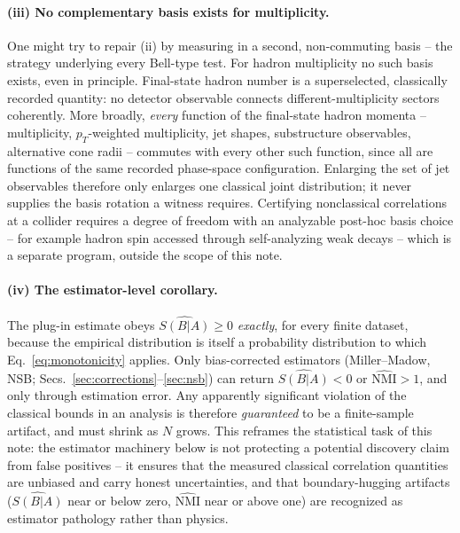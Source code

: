 \documentclass[11pt]{article}
\newcommand{\SBA}{S(B|A)}
\newcommand{\NMI}{\mathrm{NMI}}
\begin{document}
\paragraph{(iii) No complementary basis exists for multiplicity.} One
might try to repair (ii) by measuring in a second, non-commuting basis --
the strategy underlying every Bell-type test. For hadron multiplicity no
such basis exists, even in principle. Final-state hadron number is a
superselected, classically recorded quantity: no detector observable
connects different-multiplicity sectors coherently. More broadly,
\emph{every} function of the final-state hadron momenta -- multiplicity,
$p_T$-weighted multiplicity, jet shapes, substructure observables,
alternative cone radii -- commutes with every other such function, since
all are functions of the same recorded phase-space configuration.
Enlarging the set of jet observables therefore only enlarges one
classical joint distribution; it never supplies the basis rotation a
witness requires. Certifying nonclassical correlations at a collider
requires a degree of freedom with an analyzable post-hoc basis choice --
for example hadron spin accessed through self-analyzing weak decays
\cite{GPTV2022,AfikDeNova2023} -- which is a separate program, outside
the scope of this note.

\paragraph{(iv) The estimator-level corollary.} The plug-in estimate
obeys $\widehat{\SBA}\geq0$ \emph{exactly}, for every finite dataset,
because the empirical distribution is itself a probability distribution
to which Eq.~\eqref{eq:monotonicity} applies. Only bias-corrected
estimators (Miller--Madow, NSB; Secs.~\ref{sec:corrections}--\ref{sec:nsb})
can return $\widehat{\SBA}<0$ or $\widehat{\NMI}>1$, and only through
estimation error. Any apparently significant violation of the classical
bounds in an analysis is therefore \emph{guaranteed} to be a
finite-sample artifact, and must shrink as $N$ grows. This reframes the
statistical task of this note: the estimator machinery below is not
protecting a potential discovery claim from false positives -- it ensures
that the measured classical correlation quantities are unbiased and carry
honest uncertainties, and that boundary-hugging artifacts
($\widehat{\SBA}$ near or below zero, $\widehat{\NMI}$ near or above one)
are recognized as estimator pathology rather than physics.

\end{document}
